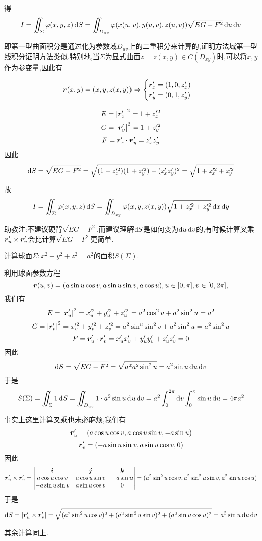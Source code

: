 得
$$I = \iint_{\Sigma} \varphi(x,y,z) \operatorname{d\!} S = \iint_{D_{uv}} \varphi(x(u,v),y(u,v),z(u,v)) \sqrt{EG - F^2} \operatorname{d\!} u \operatorname{d\!} v$$

即第一型曲面积分是通过化为参数域$D_{uv}$上的二重积分来计算的,证明方法域第一型线积分证明方法类似.特别地,当$\Sigma$为显式曲面$z = z(x,y) \in C(D_{xy})$时,可以将$x,y$作为参变量,因此有

$$\bm{r}(x,y) = (x,y,z(x,y)) \Rightarrow \begin{cases}
    \bm{r}_x' = (1,0,z_x')\\
    \bm{r}_y' = (0,1,z_y')
\end{cases}$$

$$E = \left|\bm{r}_x'\right|^2 = 1 + z_x'^2$$
$$G = \left|\bm{r}_y'\right|^2 = 1 + z_y'^2$$
$$F = \bm{r}_x' \cdot \bm{r}_y' = z_x' z_y'$$
因此
$$\operatorname{d\!} S = \sqrt{EG - F^2} = \sqrt{(1 + z_x'^2)(1 + z_y'^2) - (z_x' z_y')^2} = \sqrt{1 + z_x'^2 + z_y'^2}$$

故
$$I = \iint_{\Sigma} \varphi(x,y,z) \operatorname{d\!} S = \iint_{D_{xy}} \varphi(x,y,z(x,y)) \sqrt{1 + z_x'^2 + z_y'^2} \operatorname{d\!} x \operatorname{d\!} y$$

\begin{remark}
    助教注:不建议硬背$\sqrt{EG - F^2}$,而建议理解$\operatorname{d\!} S$是如何变为$\operatorname{d\!} u \operatorname{d\!} v$的,有时候计算叉乘$\bm{r}_u' \times \bm{r}_v'$会比计算$\sqrt{EG - F^2}$更简单.
\end{remark}


\begin{example}
    计算球面$\Sigma: x^2 + y^2 + z^2 = a^2$的面积$S(\Sigma)$.
\end{example}

\begin{solution}
    利用球面参数方程$$\bm{r}(u,v) = (a \sin u \cos v,a \sin u \sin v,a \cos u), u \in [0,\pi], v \in [0,2\pi],$$我们有
    $$E = \left|\bm{r}_u'\right|^2 = x_u'^2 + y_u'^2 + z_u'^2 = a^2 \cos^2 u + a^2 \sin^2 u = a^2$$
    $$G = \left|\bm{r}_v'\right|^2 = x_v'^2 + y_v'^2 + z_v'^2 = a^2 \sin^u \sin^2 v + a^2 \sin^2 u = a^2 \sin^2 u$$
    $$F = \bm{r}_u' \cdot \bm{r}_v' = x_u' x_v' + y_u' y_v' + z_u' z_v' = 0$$
    因此
    $$\operatorname{d\!} S = \sqrt{EG - F^2} = \sqrt{a^2 a^2 \sin^2 u} = a^2 \sin u \operatorname{d\!} u \operatorname{d\!} v$$
    于是
    $$S(\Sigma) = \iint_{\Sigma} 1 \operatorname{d\!} S = \iint_{D_{uv}} 1 \cdot a^2 \sin u \operatorname{d\!} u \operatorname{d\!} v = a^2 \int_0^{2\pi} \operatorname{d\!} v \int_0^\pi \sin u \operatorname{d\!} u = 4 \pi a^2$$
\end{solution}

\begin{solution}
    事实上这里计算叉乘也未必麻烦,我们有
    $$\bm{r}_u' = (a \cos u \cos v,a \cos u \sin v,-a \sin u)$$
    $$\bm{r}_v' = (-a \sin u \sin v,a \sin u \cos v,0)$$
    因此$$\bm{r}_u' \times \bm{r}_v' = \begin{vmatrix}
        \bm{i} & \bm{j} & \bm{k}\\
        a \cos u \cos v & a \cos u \sin v & -a \sin u\\
        -a \sin u \sin v & a \sin u \cos v & 0
    \end{vmatrix} = (a^2 \sin^2 u \cos v, a^2 \sin^2 u \sin v, a^2 \sin u \cos u)$$
    于是
    $$\operatorname{d\!} S = \left|\bm{r}_u' \times \bm{r}_v'\right| = \sqrt{(a^2 \sin^2 u \cos v)^2 + (a^2 \sin^2 u \sin v)^2 + (a^2 \sin u \cos u)^2} = a^2 \sin u \operatorname{d\!} u \operatorname{d\!} v$$

    其余计算同上.
\end{solution}

